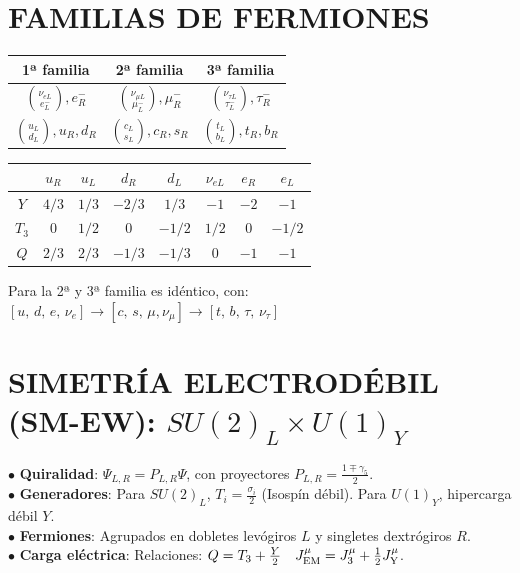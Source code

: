 

\section{FAMILIAS DE FERMIONES}

{
\centering
\begin{tabular}{c|c|c}
\textbf{1ª familia} & \textbf{2ª familia} & \textbf{3ª familia} \\
\hline
$\binom{\nu_{eL}}{e_L^-}, e_R^-$ & $\binom{\nu_{\mu L}}{\mu_L^-}, \mu_R^-$ & $\binom{\nu_{\tau L}}{\tau_L^-}, \tau_R^-$ \\
$\binom{u_L}{d_L}, u_R, d_R$ & $\binom{c_L}{s_L}, c_R, s_R$ & $\binom{t_L}{b_L}, t_R, b_R$
\end{tabular}

\vspace{5pt}

\begin{tabular}{c|c|c|c|c|c|c|c}
\hline
& $u_R$ & $u_L$ & $d_R$ & $d_L$ & $\nu_{eL}$ & $e_R$ & $e_L$ \\
\hline
$Y$ & $4/3$ & $1/3$ & $-2/3$ & $1/3$ & $-1$ & $-2$ & $-1$ \\
\hline
$T_3$ & $0$ & $1/2$ & $0$ & $-1/2$ & $1/2$ & $0$ & $-1/2$ \\
\hline
$Q$ & $2/3$ & $2/3$ & $-1/3$ & $-1/3$ & $0$ & $-1$ & $-1$
\end{tabular}

\vspace{3pt}

}

Para la 2ª y 3ª familia es idéntico, con: $[u, \, d,\, e, \, \nu_e] \to [c, \, s, \, \mu, \nu_\mu] \to [t, \, b, \, \tau, \, \nu_\tau] $



\section{SIMETRÍA ELECTRODÉBIL (SM-EW): $SU(2)_L \times U(1)_Y$}
$\bullet$ \textbf{Quiralidad}: $\Psi_{L,R} = P_{L,R}\Psi$, con proyectores $P_{L,R} = \frac{1 \mp \gamma_5}{2}$.
\\ $\bullet$ \textbf{Generadores}: Para $SU(2)_L$, $T_i = \frac{\sigma_i}{2}$ (Isospín débil). Para $U(1)_Y$, hipercarga débil $Y$.
\\ $\bullet$ \textbf{Fermiones}: Agrupados en dobletes levógiros $L$ y singletes dextrógiros $R$.
\\ $\bullet$ \textbf{Carga eléctrica}: Relaciones: $Q = T_3 + \frac{Y}{2} \quad J_{\rm EM }^\mu = J_3 ^\mu + \frac{1}{2} J_{\rm Y}^\mu$.\\


